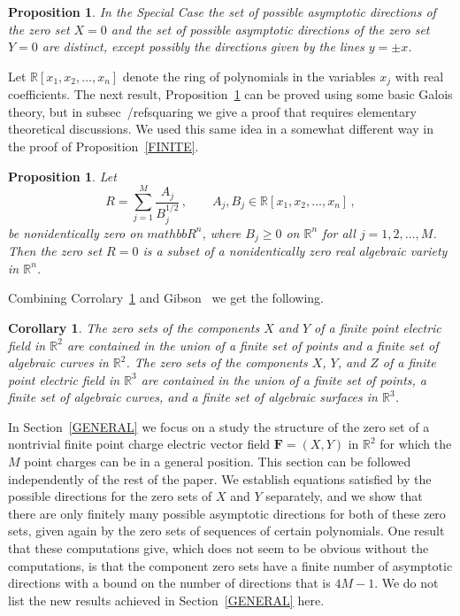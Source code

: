 \documentclass{article}
\newtheorem{cor}[thm]{Corollary}
\newtheorem{prop}[thm]{Proposition}
\theoremstyle{remark}
\numberwithin{equation}{section}
\begin{document}
\begin{prop}\label{DISTINCT} In the Special Case the set of possible asymptotic directions of the zero set $X=0$ and the set of possible asymptotic directions 
of the zero set $Y = 0$ are distinct, except possibly the directions given by the lines $y = \pm x$.
\end{prop}

Let ${\mathbb R}[x_1,x_2,\ldots,x_n]$ denote the ring of polynomials in the variables $x_j$ with real coefficients.
The next result, Proposition~\ref{squaring} can be proved using some basic Galois theory, but in subsec~/ref{squaring} we give a proof that requires elementary theoretical discussions.
We used this same idea in a somewhat different way in the proof of Proposition~\ref{FINITE}.

\begin{prop}\label{squaring} Let
$$R = \sum_{j=1}^M{\frac{A_j}{B_j^{1/2}}}\,,  \qquad A_j,B_j \in {\mathbb R}[x_1,x_2,\ldots,x_n]\,,$$
be nonidentically zero on ${mathbb R}^n$, where $B_j \ge 0$ on ${\mathbb R}^n$ for all $j=1,2,\dots,M$.  Then the zero set
$R=0$ is a subset of a nonidentically zero real algebraic variety in ${\mathbb R}^n$.
\end{prop}

Combining Corrolary~\ref{squaring} and Gibson~\cite{Gibson} we get the following. 

\begin{cor}\label{inside} The zero sets of the components $X$ and $Y$ of a finite point electric field in ${\mathbb R}^2$ are contained in the union of a finite 
set of points and a finite set of algebraic curves in ${\mathbb R}^2$. The zero sets of the components $X$, $Y$, and $Z$ of a finite point electric field in ${\mathbb R}^3$ 
are contained in the union of a finite set of points, a finite set of algebraic curves, and a finite set of algebraic surfaces in ${\mathbb R}^3$.
\end{cor}

In Section~\ref{GENERAL} we focus on a study the structure of the zero set of a nontrivial finite point charge electric vector field ${\mathbf F}=(X,Y)$ in
${\mathbb R}^2$ for which the $M$ point charges can be in a general position. This section can be followed independently of the rest of the paper. We establish 
equations satisfied by the possible directions for the zero sets of $X$ and $Y$ separately, and we show that there are only finitely many possible 
asymptotic directions for both of these zero sets, given again by the zero sets of sequences of certain polynomials.
One result that these computations give, which does not seem to be obvious without the computations, is that the component zero sets have a finite number of 
asymptotic directions with a bound on the number of directions that is $4M-1$. We do not list the new results achieved in Section~\ref{GENERAL} here.  
\end{document}
